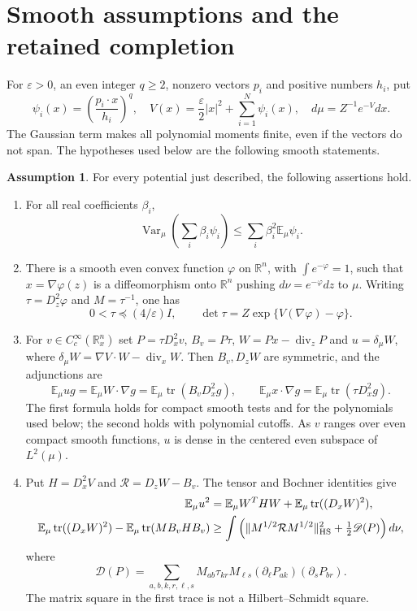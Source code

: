 \documentclass[11pt,reqno]{amsart}
\numberwithin{equation}{section}
\theoremstyle{remark}
\newcommand{\E}{\mathbb E}
\newcommand{\R}{\mathbb R}
\DeclareMathOperator{\tr}{tr}
\DeclareMathOperator{\Var}{Var}
\theoremstyle{definition}
\newtheorem{assumption}[theorem]{Assumption}
\begin{document}
\section{Smooth assumptions and the retained completion}
For $\varepsilon>0$, an even integer $q\ge2$, nonzero vectors $p_i$ and
positive numbers $h_i$, put
\[
 \psi_i(x)=\left(\frac{p_i\cdot x}{h_i}\right)^q,
 \quad V(x)=\frac\varepsilon2|x|^2+\sum_{i=1}^N\psi_i(x),
 \quad d\mu=Z^{-1}e^{-V}dx.
\]
The Gaussian term makes all polynomial moments finite, even if the
vectors do not span. The hypotheses used below are the following
smooth statements.

\begin{assumption}\label{ass:input}
For every potential just described, the following assertions hold.
\begin{enumerate}
\item For all real coefficients $\beta_i$,
\[
 \Var_\mu\left(\sum_i\beta_i\psi_i\right)
                  \le\sum_i\beta_i^2\E_\mu\psi_i.
\]
\item There is a smooth even convex function $\varphi$ on $\R^n$,
with $\int e^{-\varphi}=1$, such that $x=\nabla\varphi(z)$ is a
diffeomorphism onto $\R^n$ pushing $d\nu=e^{-\varphi}dz$ to $\mu$.
Writing $\tau=D_z^2\varphi$ and $M=\tau^{-1}$, one has
\[
 0<\tau\preceq(4/\varepsilon)I,
 \qquad \det\tau=Z\exp\{V(\nabla\varphi)-\varphi\}.
\]
\item For $v\in C_c^\infty(\R_x^n)$ set
$P=\tau D_x^2v$, $B_v=P\tau$, $W=Px-\operatorname{div}_zP$ and
$u=\delta_\mu W$, where
$\delta_\mu W=\nabla V\cdot W-\operatorname{div}_xW$.
Then $B_v,D_zW$ are symmetric, and the adjunctions are
\[
 \E_\mu ug=\E_\mu W\cdot\nabla g
              =\E_\mu\tr(B_vD_x^2g),\qquad
 \E_\mu x\cdot\nabla g=\E_\mu\tr(\tau D_x^2g).
\]
The first formula holds for compact smooth tests and for the
polynomials used below; the second holds with polynomial cutoffs.
As $v$ ranges over even compact smooth functions, $u$ is dense in the
centered even subspace of $L^2(\mu)$.
\item Put $H=D_x^2V$ and $\mathcal R=D_zW-B_v$. The tensor and Bochner
identities give
\begin{align*}
 \E_\mu u^2&=\E_\mu W^THW+\E_\mu\tr((D_xW)^2),\\
 \E_\mu\tr((D_xW)^2)-\E_\mu\tr(MB_vHB_v)
 &\ge\int\left(\|M^{1/2}\mathcal RM^{1/2}\|_{\rm HS}^2
                    +\tfrac12\mathscr D(P)\right)d\nu,
\end{align*}
where
\[
 \mathscr D(P)=\sum_{a,b,k,r,\ell,s}
 M_{ab}\tau_{kr}M_{\ell s}(\partial_\ell P_{ak})(\partial_sP_{br}).
\]
The matrix square in the first trace is not a Hilbert--Schmidt square.
\end{enumerate}
\end{assumption}
\end{document}
